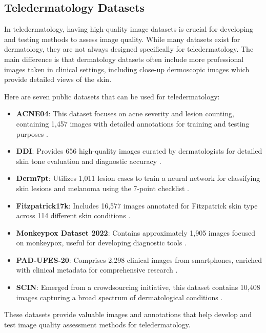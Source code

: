 \subsection{Teledermatology Datasets}
\label{sub:DatasetsTD}
In teledermatology, having high-quality image datasets is crucial for developing and testing methods to assess image quality. While many datasets exist for dermatology, they are not always designed specifically for teledermatology. The main difference is that dermatology datasets often include more professional images taken in clinical settings, including close-up dermoscopic images which provide detailed views of the skin. \par
\vspace{\baselineskip}
\noindent
Here are seven public datasets that can be used for teledermatology:
\begin{itemize}
    \item \textbf{ACNE04}: This dataset focuses on acne severity and lesion counting, containing 1,457 images with detailed annotations for training and testing purposes \autocite{ACNE04}.
    \item \textbf{DDI}: Provides 656 high-quality images curated by dermatologists for detailed skin tone evaluation and diagnostic accuracy \autocite{DDI}.
    \item \textbf{Derm7pt}: Utilizes 1,011 lesion cases to train a neural network for classifying skin lesions and melanoma using the 7-point checklist \autocite{Derm7pt}.
    \item \textbf{Fitzpatrick17k}: Includes 16,577 images annotated for Fitzpatrick skin type across 114 different skin conditions \autocite{F17K}.
    \item \textbf{Monkeypox Dataset 2022}: Contains approximately 1,905 images focused on monkeypox, useful for developing diagnostic tools \autocite{Monkeypox}.
    \item \textbf{PAD-UFES-20}: Comprises 2,298 clinical images from smartphones, enriched with clinical metadata for comprehensive research \autocite{PAD-UFES-20}.
    \item \textbf{SCIN}: Emerged from a crowdsourcing initiative, this dataset contains 10,408 images capturing a broad spectrum of dermatological conditions \autocite{SCIN}.
\end{itemize}
\noindent
These datasets provide valuable images and annotations that help develop and test image quality assessment methods for teledermatology. \par 

